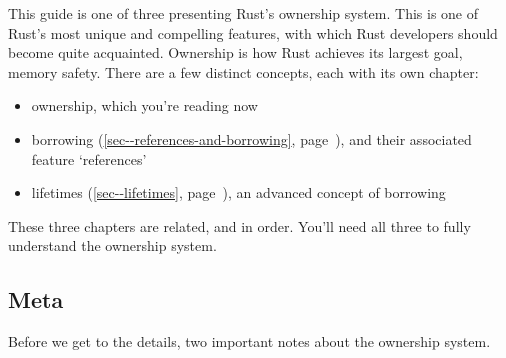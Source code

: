 \documentclass[a4paper,]{book}
\renewcommand*{\hyperref}[2][\ar]{%
  \def\ar{#2}%
  #2 (\autoref{#1}, page~\pageref{#1})}
\newenvironment{Shaded}{\begin{snugshade}}{\end{snugshade}}
\newcommand{\KeywordTok}[1]{\textcolor[rgb]{0.13,0.29,0.53}{\textbf{{#1}}}}
\newcommand{\DecValTok}[1]{\textcolor[rgb]{0.00,0.00,0.81}{{#1}}}
\newcommand{\StringTok}[1]{\textcolor[rgb]{0.31,0.60,0.02}{{#1}}}
\newcommand{\CommentTok}[1]{\textcolor[rgb]{0.56,0.35,0.01}{\textit{{#1}}}}
\newcommand{\OtherTok}[1]{\textcolor[rgb]{0.56,0.35,0.01}{{#1}}}
\newcommand{\PreprocessorTok}[1]{\textcolor[rgb]{0.56,0.35,0.01}{\textit{{#1}}}}
\newcommand{\NormalTok}[1]{{#1}}
\providecommand{\tightlist}{%
  \setlength{\itemsep}{0pt}\setlength{\parskip}{0pt}}
\begin{document}
\begin{Shaded}
\end{Shaded}


This guide is one of three presenting Rust's ownership system. This is
one of Rust's most unique and compelling features, with which Rust
developers should become quite acquainted. Ownership is how Rust
achieves its largest goal, memory safety. There are a few distinct
concepts, each with its own chapter:

\begin{itemize}
\tightlist
\item
  ownership, which you're reading now
\item
  \hyperref[sec--references-and-borrowing]{borrowing}, and their
  associated feature `references'
\item
  \hyperref[sec--lifetimes]{lifetimes}, an advanced concept of borrowing
\end{itemize}

These three chapters are related, and in order. You'll need all three to
fully understand the ownership system.

\subsection{Meta}\label{meta}

Before we get to the details, two important notes about the ownership
system.
\end{document}
